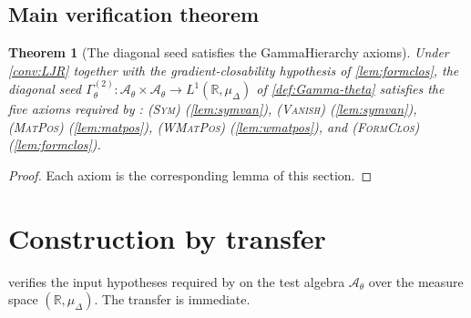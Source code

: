 \documentclass[11pt,reqno]{amsart}
\theoremstyle{plain}
\newtheorem{theorem}{Theorem}[section]
\theoremstyle{definition}
\theoremstyle{remark}
\newcommand{\R}{\mathbb{R}}
\newcommand{\cA}{\mathcal A}
\begin{document}
\subsection{Main verification theorem}\label{sec:axioms-main}

\begin{theorem}[The diagonal seed satisfies the GammaHierarchy axioms]\label{thm:axioms}
Under \cref{conv:LJR} together with the gradient-closability
hypothesis of \cref{lem:formclos}, the diagonal seed
$\Gamma^{(2)}_{\theta}\colon\cA_{\theta}\times\cA_{\theta}\to L^{1}(\R,\mu_{\Delta})$
of \cref{def:Gamma-theta} satisfies the five axioms required by
\cite[Ass.~2.4]{GammaHierarchyDivergence}:
{\normalfont\textsc{(Sym)}} (\cref{lem:symvan}), {\normalfont\textsc{(Vanish)}}
(\cref{lem:symvan}), {\normalfont\textsc{(MatPos)}} (\cref{lem:matpos}),
{\normalfont\textsc{(WMatPos)}} (\cref{lem:wmatpos}), and {\normalfont\textsc{(FormClos)}}
(\cref{lem:formclos}).
\end{theorem}

\begin{proof}
Each axiom is the corresponding lemma of this section.
\end{proof}

\section{Construction by transfer}\label{sec:transfer}

 verifies the input hypotheses required by
\cite[Thm.~A and Thm.~B]{GammaHierarchyDivergence} on the test
algebra $\cA_{\theta}$ over the measure space
$(\R,\mu_{\Delta})$. The transfer is immediate.
\end{document}

